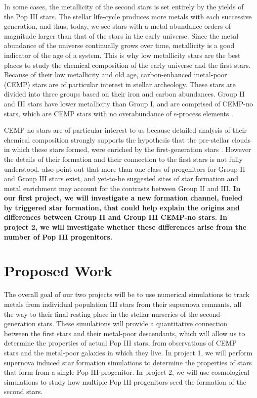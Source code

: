 \documentclass[letterpaper, 12pt]{article}
\begin{document}
In some cases, the metallicity of the second stars is set entirely by the yields of the Pop III stars. The stellar life-cycle produces more metals with each successive generation, and thus, today, we see stars with a metal abundance orders of magnitude larger than that of the stars in the early universe. Since the metal abundance of the universe continually grows over time, metallicity is a good indicator of the age of a system. This is why low metallicity stars are the best places to study the chemical composition of the early universe and the first stars. Because of their low metallicity and old age, carbon-enhanced metal-poor (CEMP) stars are of particular interest in stellar archeology. These stars are divided into three groups based on their iron and carbon abundances. Group II and III stars have lower metallicity than Group I, and are comprised of CEMP-no stars, which are CEMP stars with no overabundance of s-process elements \citep{Maeder2015}. 

CEMP-no stars are of particular interest to us because detailed analysis of their chemical composition strongly supports the hypothesis that the pre-stellar clouds in which these stars formed, were enriched by the first-generation stars \citep{Yoon2016}. However the details of their formation and their connection to the first stars is not fully understood. \cite{Yoon2016} also point out that more than one class of progenitors for Group II and Group III stars exist, and yet-to-be suggested sites of star formation and metal enrichment may account for the contrasts between Group II and III. \textbf{In our first project, we will investigate a new formation channel, fueled by triggered star formation, that could help explain the origins and differences between Group II and Group III CEMP-no stars. In project 2, we will investigate whether these differences arise from the number of Pop III progenitors.}


\section{Proposed Work}
The overall goal of our two projects will be to use numerical simulations to track metals from individual population III stars from their supernova remnants, all the way to their final resting place in the stellar nurseries of the second-generation stars. These simulations will provide a quantitative connection between the first stars and their metal-poor descendants, which will allow us to determine the properties of actual Pop III stars, from observations of CEMP stars and the metal-poor galaxies in which they live. In project 1, we will perform supernova induced star formation simulations to determine the properties of stars that form from a single Pop III progenitor. In project 2, we will use cosmological simulations to study how multiple Pop III progenitors seed the formation of the second stars.
\end{document}
